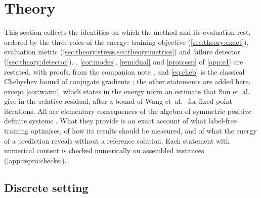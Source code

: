 \section{Theory}\label{sec:theory}

This section collects the identities on which the method and its evaluation rest, ordered
by the three roles of the energy: training objective (\cref{sec:theory:exact}), evaluation
metric (\cref{sec:theory:stress,sec:theory:metrics}) and failure detector
(\cref{sec:theory:detector}). , \cref{cor:modes}, \cref{rem:dual}
and \cref{prop:sep} of \ref{app:e1} are restated, with proofs, from the companion note
\cite{CaoSong2026}, and \eqref{eq:cheb} is the classical Chebyshev bound of conjugate
gradients \cite{Saad2003}; the other statements are added here, except \cref{cor:warm}, which
states in the energy norm an estimate that Sun et~al.~\cite{Sun2026FEVessel} give in the
relative residual, after a bound of Wang et~al.~\cite{Wang2026PretrainFEM} for fixed-point
iterations. All are elementary consequences of the algebra of symmetric positive definite
systems
\cite{Ciarlet1978,Saad2003}. What they provide is an exact account of what label-free
training optimises, of how its results should be measured, and of what the energy of a
prediction reveals without a reference solution. Each statement with numerical content is
checked numerically on assembled instances (\ref{app:repro:checks}).

\subsection{Discrete setting}\label{sec:theory:setting}

